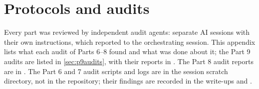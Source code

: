 \section{Protocols and audits}\label{app:audits}

Every part was reviewed by independent audit agents: separate AI sessions with their own instructions, which reported to the orchestrating session. This appendix lists what each audit of Parts 6--8 found and what was done about it; the Part 9 audits are listed in \cref{sec:p9audits}, with their reports in . The Part 8 audit reports are in . The Part 6 and 7 audit scripts and logs are in the session scratch directory, not in the repository; their findings are recorded in the write-ups  and .

